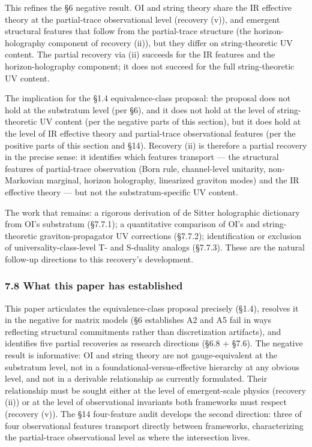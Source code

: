 \documentclass[
]{article}
\begin{document}
This refines the §6 negative result. OI and string theory share the IR
effective theory at the partial-trace observational level (recovery
(v)), and emergent structural features that follow from the
partial-trace structure (the horizon-holography component of recovery
(ii)), but they differ on string-theoretic UV content. The partial
recovery via (ii) succeeds for the IR features and the
horizon-holography component; it does not succeed for the full
string-theoretic UV content.

The implication for the §1.4 equivalence-class proposal: the proposal
does not hold at the substratum level (per §6), and it does not hold at
the level of string-theoretic UV content (per the negative parts of this
section), but it does hold at the level of IR effective theory and
partial-trace observational features (per the positive parts of this
section and §14). Recovery (ii) is therefore a partial recovery in the
precise sense: it identifies which features transport --- the structural
features of partial-trace observation (Born rule, channel-level
unitarity, non-Markovian marginal, horizon holography, linearized
graviton modes) and the IR effective theory --- but not the
substratum-specific UV content.

The work that remains: a rigorous derivation of de Sitter holographic
dictionary from OI's substratum (§7.7.1); a quantitative comparison of
OI's and string-theoretic graviton-propagator UV corrections (§7.7.2);
identification or exclusion of universality-class-level T- and S-duality
analogs (§7.7.3). These are the natural follow-up directions to this
recovery's development.

\hypertarget{what-this-paper-has-established}{%
\subsubsection{7.8 What this paper has
established}\label{what-this-paper-has-established}}

This paper articulates the equivalence-class proposal precisely (§1.4),
resolves it in the negative for matrix models (§6 establishes A2 and A5
fail in ways reflecting structural commitments rather than
discretization artifacts), and identifies five partial recoveries as
research directions (§6.8 + §7.6). The negative result is informative:
OI and string theory are not gauge-equivalent at the substratum level,
not in a foundational-versus-effective hierarchy at any obvious level,
and not in a derivable relationship as currently formulated. Their
relationship must be sought either at the level of emergent-scale
physics (recovery (ii)) or at the level of observational invariants both
frameworks must respect (recovery (v)). The §14 four-feature audit
develops the second direction: three of four observational features
transport directly between frameworks, characterizing the partial-trace
observational level as where the intersection lives.
\end{document}
